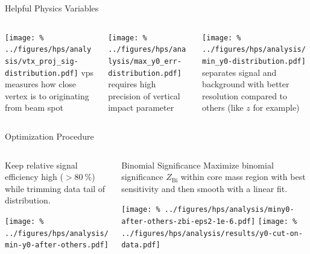 \documentclass[aspectratio=169]{beamer}
\begin{document}
\begin{frame}{Helpful Physics Variables}
  \begin{columns}
    \begin{column}{0.3\textwidth}
      \texttt{[image: \%
        ../figures/hps/analysis/vtx\_proj\_sig-distribution.pdf]}
      \ac{vps} measures how close vertex
      is to originating from beam spot
    \end{column}
    \begin{column}{0.3\textwidth}
      \texttt{[image: \%
        ../figures/hps/analysis/max\_y0\_err-distribution.pdf]}
      \maxyzeroerr requires high precision
      of vertical impact parameter
    \end{column}
    \begin{column}{0.3\textwidth}
      \texttt{[image: \%
        ../figures/hps/analysis/min\_y0-distribution.pdf]}
      \minyzero separates signal and background
      with better resolution compared to others
      (like $z$ for example)
    \end{column}
  \end{columns}
\end{frame}


\begin{frame}{Optimization Procedure}
  \begin{columns}
    \begin{column}{0.3\textwidth}
      {Keep relative signal efficiency high ($> \qty{80}{\%}$)
      while trimming data tail of \minyzero distribution.}
      
      \vfill

      {
      \texttt{[image: \%
        ../figures/hps/analysis/min-y0-after-others.pdf]}
      }
    \end{column}
    \begin{column}{0.69\textwidth}
      \begin{block}{Binomial Significance}
        Maximize binomial significance $Z_\mathrm{Bi}$
        within core mass region with best sensitivity
        and then smooth with a linear fit.
      \end{block}
      \texttt{[image: \%
        ../figures/hps/analysis/miny0-after-others-zbi-eps2-1e-6.pdf]}
      \texttt{[image: \%
        ../figures/hps/analysis/results/y0-cut-on-data.pdf]}
    \end{column}
  \end{columns}
\end{frame}
\end{document}
